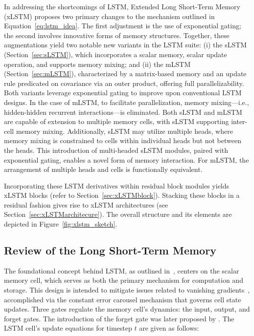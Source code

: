 In addressing the shortcomings of LSTM, Extended Long Short-Term Memory (xLSTM) proposes two primary changes to the mechanism outlined in Equation~\eqref{eq:lstm_idea}. The first adjustment is the use of exponential gating; the second involves innovative forms of memory structures. Together, these augmentations yield two notable new variants in the LSTM suite: (i) the sLSTM (Section~\ref{sec:sLSTM}), which incorporates a scalar memory, scalar update operation, and supports memory mixing; and (ii) the mLSTM (Section~\ref{sec:mLSTM}), characterized by a matrix-based memory and an update rule predicated on covariance via an outer product, offering full parallelizability. Both variants leverage exponential gating to improve upon conventional LSTM designs. In the case of mLSTM, to facilitate parallelization, memory mixing---i.e., hidden-hidden recurrent interactions---is eliminated. Both sLSTM and mLSTM are capable of extension to multiple memory cells, with sLSTM supporting inter-cell memory mixing. Additionally, sLSTM may utilize multiple heads, where memory mixing is constrained to cells within individual heads but not between the heads. This introduction of multi-headed sLSTM modules, paired with exponential gating, enables a novel form of memory interaction. For mLSTM, the arrangement of multiple heads and cells is functionally equivalent.

Incorporating these LSTM derivatives within residual block modules yields xLSTM blocks (refer to Section~\ref{sec:xLSTMblock}). Stacking these blocks in a residual fashion gives rise to xLSTM architectures (see Section~\ref{sec:xLSTMarchitecure}). The overall structure and its elements are depicted in Figure~\ref{fig:xlstm_sketch}.

\subsection{Review of the Long Short-Term Memory}
\label{sec:orgLSTM}

The foundational concept behind LSTM, as outlined in~\citep{Hochreiter:91,Hochreiter:97nips,Hochreiter:97}, centers on the scalar memory cell, which serves as both the primary mechanism for computation and storage. This design is intended to mitigate issues related to vanishing gradients~\citep{Hochreiter:91,Hochreiter:00book}, accomplished via the constant error carousel mechanism that governs cell state updates. Three gates regulate the memory cell’s dynamics: the input, output, and forget gates. The introduction of the forget gate was later proposed by \citet{Gers:00}. The LSTM cell’s update equations for timestep $t$ are given as follows:

